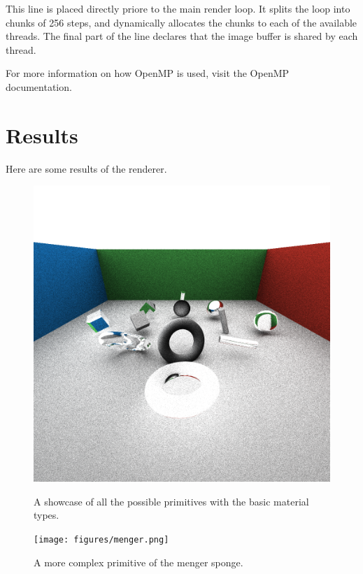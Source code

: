 \documentclass{amsart}
\begin{document}
This line is placed directly priore to the main render loop. It splits the loop
into chunks of 256 steps, and dynamically allocates the chunks to each of the
available threads. The final part of the line declares that the image buffer is
shared by each thread.

For more information on how OpenMP is used, visit the OpenMP documentation.

\section{Results}%
\label{sec:Results}

Here are some results of the renderer.

\begin{figure}[!htb]
    \includegraphics[width=\linewidth]{figures/objs.png}
    \caption{A showcase of all the possible primitives with the basic material
      types.}
  \endminipage\hfill
    \texttt{[image: figures/menger.png]}
    \caption{A more complex primitive of the menger sponge.}
  \endminipage\hfill
\end{figure}
\end{document}
